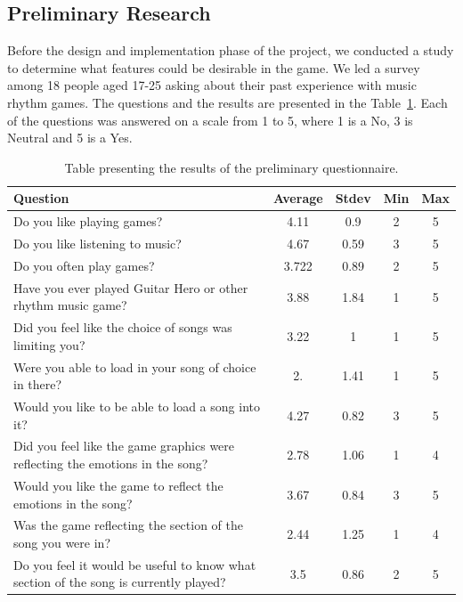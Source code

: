 \subsection*{Preliminary Research}

Before the design and implementation phase of the project, we conducted a study to determine what features could be desirable in the game. We led a survey among 18 people aged 17-25 asking about their past experience with music rhythm games. 
The questions and the results are presented in the Table~\ref{table:preliminaryquestions}. Each of the questions was answered on a scale from 1 to 5, where 1 is a No,  3 is Neutral and 5 is a Yes.

\begin{table}
\begin{center}
\begin{tabular}{| p{8cm} | c | c | c | c | } 																								      \hline 
\textbf{Question} & \textbf{Average} & \textbf{Stdev} & \textbf{Min} & \textbf{Max} 						   \\ \hline \hline
Do you like playing games? & 4.11 & 0.9 & 2 & 5		 					 					 									\\ \hline 
Do you like listening to music? & 4.67 & 0.59 & 3 & 5		 					 					 								\\ \hline 
Do you often play games? & 3.722 & 0.89 & 2 & 5 		 					 					 								\\ \hline 
Have you ever played Guitar Hero or other rhythm music game? & 3.88 & 1.84  & 1 & 5							\\ \hline 
Did you feel like the choice of songs was limiting you? & 3.22 & 1 & 1 & 5 					 							\\ \hline 
Were you able to load in your song of choice in there? & 2. & 1.41 & 1 & 5 					 							\\ \hline 
Would you like to be able to load a song into it? & 4.27 & 0.82 & 3 & 5 				 									\\ \hline 
Did you feel like the game graphics were reflecting the emotions in the song? & 2.78 & 1.06 & 1 & 4 			\\ \hline 
Would you like the game to reflect the emotions in the song? & 3.67 & 0.84 & 3 & 5 	 								\\ \hline 
Was the game reflecting the section of the song you were in? & 2.44 & 1.25 & 1 & 4  								\\ \hline 
Do you feel it would be useful to know what section of the song is currently played? & 3.5 & 0.86 & 2 & 5  	\\ \hline 
\end{tabular}
\caption{Table presenting the results of the preliminary questionnaire.}
\label{table:preliminaryquestions}
\end{center}
\end{table}

